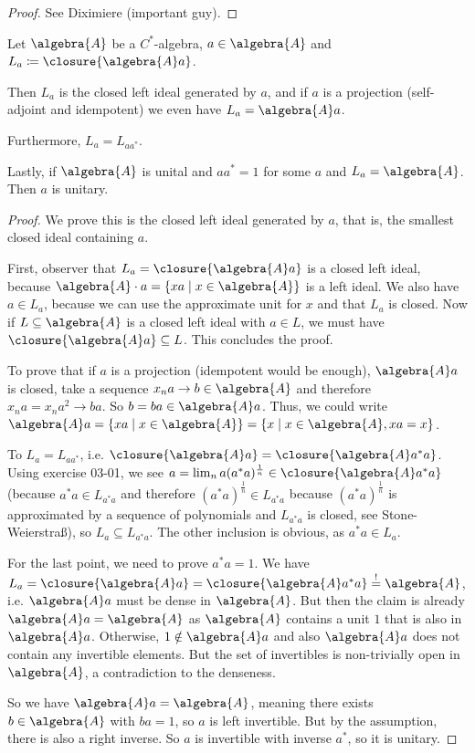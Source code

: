 \documentclass[a4paper]{article}
\begin{document}
\begin{proof}
	See Diximiere (important guy).
\end{proof}

\begin{exercise}[04-04]
	Let $\algebra{A}$ be a $C^*$-algebra, $a \in \algebra{A}$ and $L_a \coloneq \closure{\algebra{A} a}$.
	
	Then $L_a$ is the closed left ideal generated by $a$, and if $a$ is a projection (self-adjoint and idempotent) we even have $L_a = \algebra{A} a$.

	Furthermore, $L_a = L_{a a^*}$.

	Lastly, if $\algebra{A}$ is unital and $aa^*=1$ for some $a$ and $L_a = \algebra{A}$. Then $a$ is unitary.

\end{exercise}

\begin{proof}
	We prove this is the closed left ideal generated by $a$, that is, the smallest closed ideal containing $a$.

	First, observer that $L_a = \closure{\algebra{A} a} $ is a closed left ideal, because $\algebra{A} \cdot a = \{ x a \mid x \in \algebra{A} \}$ is a left ideal.
	We also have $a \in L_a$, because we can use the approximate unit for $x$ and that $L_a$ is closed.
	Now if $L \subseteq \algebra{A}$ is a closed left ideal with $a \in L$, we must have $\closure{\algebra{A} a} \subseteq L$.
	This concludes the proof.

	To prove that if $a$ is a projection (idempotent would be enough), $\algebra{A} a$ is closed, take a sequence $x_n a \to b \in \algebra{A}$ and therefore $x_n a = x_n a^2 \to ba$.
	So $b = ba \in \algebra{A} a$.
	Thus, we could write $\algebra{A} a = \{ x a \mid x \in \algebra{A} \} = \{ x \mid x \in \algebra{A}, xa = x\}$.

	To $L_a = L_{a a^*}$, i.e. $\closure{\algebra{A}a} = \closure{\algebra{A} a^* a}$.
	Using exercise 03-01, we see $a = \lim_n a (a^* a)^{\frac{1}{n}} \in \closure{\algebra{A} a^* a}$ (because $a^* a \in L_{a^* a}$ and therefore $(a^* a)^\frac{1}{n} \in L_{a^* a}$ because $(a^* a)^\frac{1}{n}$ is approximated by a sequence of polynomials and $L_{a^* a}$ is closed, see Stone-Weierstraß), so $L_a \subseteq L_{a^* a}$. The other inclusion is obvious, as $a^* a \in L_a$.

	For the last point, we need to prove $a^*a = 1$. We have $L_a = \closure{\algebra{A} a} = \closure{\algebra{A} a ^* a} \overset{!}{=} \algebra{A}$, i.e. $\algebra{A} a$ must be dense in $\algebra{A}$.
	But then the claim is already $\algebra{A} a = \algebra{A}$ as $\algebra{A}$ contains a unit $1$ that is also in $\algebra{A} a$.
	Otherwise, $1 \notin \algebra{A} a$ and also $\algebra{A} a$ does not contain any invertible elements.
	But the set of invertibles is non-trivially open in $\algebra{A}$, a contradiction to the denseness.

	So we have $\algebra{A} a = \algebra{A}$, meaning there exists $b \in \algebra{A}$ with $b a = 1$, so $a$ is left invertible.
	But by the assumption, there is also a right inverse.
	So $a$ is invertible with inverse $a^*$, so it is unitary.
\end{proof}
\end{document}
